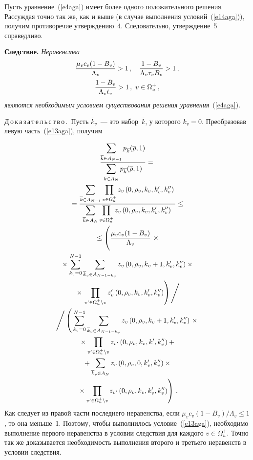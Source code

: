 \begin{multicols}{2}
Пусть уравнение~(\ref{e4aga}) имеет более одного положительного 
решения. Рассуждая точно так же, как и выше (в случае выполнения 
условий~(\ref{e14aga})), получим противоречие утверждению~4. 
Следовательно, утверждение~5 справедливо.
\medskip

\noindent
\textbf{Следствие.} \textit{Неравенства}
\begin{gather*}
\displaystyle\frac{\displaystyle \mu_v c_v (1-B_v)\mathstrut}{\displaystyle \Lambda_v\mathstrut}>1\,,\quad \displaystyle\frac{\displaystyle 1-B_v\mathstrut}{\displaystyle \Lambda_v \tau_v B_v\mathstrut}>1\,,\\ 
\displaystyle\frac{\displaystyle 1-B_v\mathstrut}{\displaystyle \Lambda_v t_v\mathstrut}>1\,,\ v\in\Omega_u^+\,,
\end{gather*}
\textit{являются необходимым условием существования решения 
уравнения}~(\ref{e4aga}).

\medskip
\noindent
Д\,о\,к\,а\,з\,а\,т\,е\,л\,ь\,с\,т\,в\,о\,.\ Пусть $\overline{k}_v$~--- это 
набор~$\overline{k}$, у которого $k_v=0$. Преобразовав левую 
часть~(\ref{e13aga}), получим

\noindent
\begin{multline*}
\fr{\sum\limits_{\overline{k}\in A_{N-1}} p_{\overline{k}} (\overline{\rho},1)}
{ \sum\limits_{\overline{k}\in A_{N}} 
 p_{\overline{k}}(\overline{\rho},1)} 
={}
\\
{}=
\fr{\sum\limits_{\overline{k}\in A_{N-1}}\prod\limits_{v\in \Omega_u^+} 
z_v\left(0,\rho_v,k_v,k_v^\prime , k_v^{\prime\prime}\right)}
{\sum\limits_{\overline{k}\in A_{N}}
\prod\limits_{v\in \Omega_u^+} z_v\left (0,\rho_v,k_v,k_v^\prime , k_v^{\prime\prime}\right )} \leq{}
\\
{}\leq
\left ( 
\vphantom{\prod\limits_{v^\prime\in\Omega_u^+\backslash v}}
\fr{\mu_v c_v(1-B_v)}{\Lambda_v}\right. \times{}\\
{}\times \sum\limits_{k_v=0}^{N-1}\sum\limits_{\overline{k}_v\in A_{N-1-k_v}} z_v\left(0,\rho_v,k_v+1,k_v^\prime , 
k_v^{\prime\prime}\right )\times{}\\
{}\times \left.\prod\limits_{v^\prime\in\Omega_u^+\backslash v} z_v^\prime 
\left(0,\rho_v,k_v,k_v^\prime , k_v^{\prime\prime}\right) \right)
\Bigg /{}\\
\Bigg / \left ( 
\vphantom{\prod\limits_{v^\prime\in\Omega_u^+\backslash v}}
\sum\limits_{k_v=0}^{N-1} \sum\limits_{\overline{k}_v\in A_{N-1-k_v}} z_v 
\left (0,\rho_v,k_v+1,k_v^\prime , 
k_v^{\prime\prime}\right )\right. \times{}\\
{}\times \prod\limits_{v^\prime\in\Omega_u^+\backslash v} 
z_{v^\prime}\left(0,\rho_v,k_v,k^\prime , k_v^{\prime\prime}\right)+{}\\
{}+
\sum\limits_{\overline{k}_v\in A_N} z_v\left (0,\rho_v, 0,k_v^\prime , 
k_v^{\prime\prime}\right)\times{}\\
\left.{}\times \prod\limits_{v^\prime\in\Omega_u^+\backslash v}z_{v^\prime} 
\left(0,\rho_v,k_v,k_v^\prime , k_v^{\prime\prime}\right )\right )\,.
\end{multline*}
Как следует из правой части последнего неравенства, если 
$\mu_v c_v (1-B_v)/\Lambda_v \leq 1$, то она меньше~1. Поэтому, чтобы 
выполнилось условие~(\ref{e13aga}), необходимо выполнение первого 
неравенства в условии следствия для каждого $v\in\Omega_u^+$. Точно так же 
доказывается необходимость выполнения второго и третьего неравенств в 
условии следствия.


\end{multicols}
